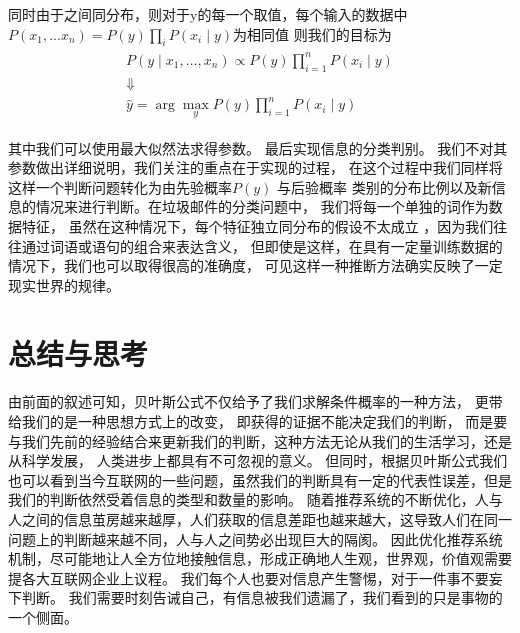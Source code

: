 \documentclass[a4paper,AutoFakeBold,oneside,12pt,fontset=windows]{book}
\begin{document}
同时由于之间同分布，则对于y的每一个取值，每个输入的数据中$P(x_1,...x_n)=P\left(y\right) \prod_{i} P\left(x_i \mid y\right)$为相同值
则我们的目标为
\begin{gather}
	\begin{array}{r}
		P\left(y \mid x_{1}, \ldots, x_{n}\right) \propto P(y) \prod_{i=1}^{n} P\left(x_{i} \mid y\right) \\
		\Downarrow \\
		\hat{y}=\arg \max _{y} P(y) \prod_{i=1}^{n} P\left(x_{i} \mid y\right)
		\end{array}
\end{gather}

其中我们可以使用最大似然法求得参数。
最后实现信息的分类判别。
我们不对其参数做出详细说明，我们关注的重点在于实现的过程，
在这个过程中我们同样将这样一个判断问题转化为由先验概率$P(y)$
与后验概率%
类别的分布比例以及新信息的情况来进行判断。在垃圾邮件的分类问题中，
我们将每一个单独的词作为数据特征，
虽然在这种情况下，每个特征独立同分布的假设不太成立
，因为我们往往通过词语或语句的组合来表达含义，
但即使是这样，在具有一定量训练数据的情况下，我们也可以取得很高的准确度，
可见这样一种推断方法确实反映了一定现实世界的规律。
\section{总结与思考}
由前面的叙述可知，贝叶斯公式不仅给予了我们求解条件概率的一种方法，
更带给我们的是一种思想方式上的改变，
即获得的证据不能决定我们的判断，
而是要与我们先前的经验结合来更新我们的判断，这种方法无论从我们的生活学习，还是从科学发展，
人类进步上都具有不可忽视的意义。
但同时，根据贝叶斯公式我们也可以看到当今互联网的一些问题，虽然我们的判断具有一定的代表性误差，但是我们的判断依然受着信息的类型和数量的影响。
随着推荐系统的不断优化，人与人之间的信息茧房越来越厚，人们获取的信息差距也越来越大，这导致人们在同一问题上的判断越来越不同，人与人之间势必出现巨大的隔阂。
因此优化推荐系统机制，尽可能地让人全方位地接触信息，形成正确地人生观，世界观，价值观需要提各大互联网企业上议程。
我们每个人也要对信息产生警惕，对于一件事不要妄下判断。
我们需要时刻告诫自己，有信息被我们遗漏了，我们看到的只是事物的一个侧面。


\clearpage{}

\end{document}
